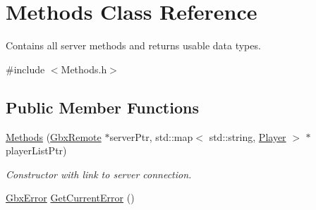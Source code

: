 \hypertarget{classMethods}{\section{Methods Class Reference}
\label{classMethods}
}


Contains all server methods and returns usable data types.  




{\ttfamily \#include $<$Methods.\-h$>$}

\subsection*{Public Member Functions}
\begin{DoxyCompactItemize}
\item 
\hyperlink{classMethods_a6a1eff4e430d47fefa63b0d71a3cc99d}{Methods} (\hyperlink{classGbxRemote}{Gbx\-Remote} $\ast$server\-Ptr, std\-::map$<$ std\-::string, \hyperlink{structPlayer}{Player} $>$ $\ast$player\-List\-Ptr)
\begin{DoxyCompactList}\small\item\em Constructor with link to server connection. \end{DoxyCompactList}\item 
\hypertarget{classMethods_ada628a190370ff0914a55bfd8e0acd4f}{\hyperlink{structGbxError}{Gbx\-Error} \hyperlink{classMethods_ada628a190370ff0914a55bfd8e0acd4f}{Get\-Current\-Error} ()}\label{classMethods_ada628a190370ff0914a55bfd8e0acd4f}


\end{DoxyCompactItemize}
